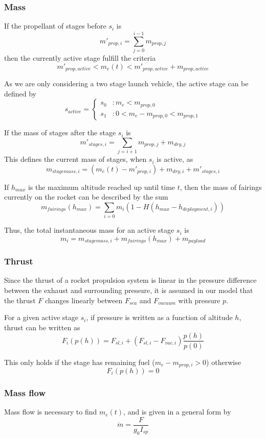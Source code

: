 \documentclass[11pt]{article}
\begin{document}
\subsubsection{Mass}

If the propellant of stages before $s_i$ is
$$
m'_{prop,i} = \sum_{j=0}^{i-1} m_{prop,j}
$$
then the currently active stage fulfill the criteria
$$
m'_{prop,active} < m_e(t) < m'_{prop,active} + m_{prop,active}
$$

As we are only considering a two stage launch vehicle, the active stage can be defined by
$$
s_{active} = \begin{cases} 
  s_0 & : m_e < m_{prop,0} \\
  s_1 & : 0 < m_e - m_{prop,0} < m_{prop,1}
\end{cases}
$$

If the mass of stages after the stage $s_i$ is
$$
m'_{stages,i} = \sum_{j=i+1} m_{prop,j} + m_{dry,j}
$$
This defines the current mass of stages, when $s_{i}$ is active, as
$$
m_{stagemass,i} = \left( m_e(t) - m'_{prop,i} \right) + m_{dry,i} + m'_{stages,i}
$$

If $h_{max}$ is the maximum altitude reached up until time $t$, then the mass of fairings currently on the rocket can be described by the sum
$$
m_{fairings}(h_{max}) = \sum_{i=0} m_i (1 - H(h_{max} - h_{deployment,i}))
$$

Thus, the total instantaneous mass for an active stage $s_i$ is
$$
m_i = m_{stagemass,i} + m_{fairings}(h_{max}) + m_{payload}
$$

\subsubsection{Thrust}

Since the thrust of a rocket propulsion system is linear in the pressure difference between the exhaust and surrounding pressure, 
it is assumed in our model that the thrust $F$ changes linearly between $F_{sea}$ and $F_{vacuum}$ with pressure $p$.
%
%

For a given active stage $s_i$, if pressure is written as a function of altitude $h$, thrust can be written as 
$$
F_i(p(h)) = F_{sl,i} + \left( F_{sl,i} - F_{vac,i} \right) \frac{p(h)}{p(0)}
$$

This only holds if the stage has remaining fuel ($m_e - m_{prop,i} > 0$) 
otherwise 
$$
F_i(p(h)) = 0
$$

\subsubsection{Mass flow}
% 
%
Mass flow is necessary to find $m_e(t)$, and is given in a general form by
$$
\dot{m} = \frac{F}{ g_0 I_{sp}}
$$
\end{document}
